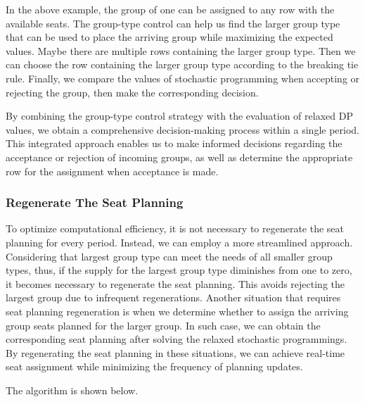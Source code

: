 In the above example, the group of one can be assigned to any row with the available seats. The group-type control can help us find the larger group type that can be used to place the arriving group while maximizing the expected values. Maybe there are multiple rows containing the larger group type. Then we can choose the row containing the larger group type according to the breaking tie rule. 
Finally, we compare the values of stochastic programming when accepting or rejecting the group, then make the corresponding decision.

By combining the group-type control strategy with the evaluation of relaxed DP values, we obtain a comprehensive decision-making process within a single period. This integrated approach enables us to make informed decisions regarding the acceptance or rejection of incoming groups, as well as determine the appropriate row for the assignment when acceptance is made.

\subsubsection{Regenerate The Seat Planning}
To optimize computational efficiency, it is not necessary to regenerate the seat planning for every
period. Instead, we can employ a more streamlined approach. Considering that largest group type can
meet the needs of all smaller group types, thus, if the supply for the largest group type diminishes from one to zero, it becomes necessary to regenerate the seat planning. This avoids rejecting the largest group due to infrequent regenerations. Another situation that requires seat planning regeneration is when we determine whether to assign the arriving group seats planned for the larger group. In such case, we can obtain the corresponding seat planning after solving the relaxed stochastic programmings. By regenerating the seat planning in these situations, we can achieve real-time seat assignment while minimizing the frequency of planning updates.




The algorithm is shown below.


